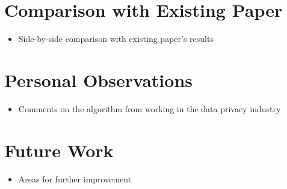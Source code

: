 \documentclass[11pt]{article}       %
\newenvironment{slide}[1]        {\section{#1} \begin{itemize}}%
                                 {\end{itemize}}
\begin{document}
\begin{slide}{Comparison with Existing Paper}
\item Side-by-side comparison with existing paper's results
\end{slide}

\begin{slide}{Personal Observations}
\item Comments on the algorithm from working in the data privacy industry
\end{slide}

\begin{slide}{Future Work}
\item Areas for further improvement
\end{slide}




\end{document}
